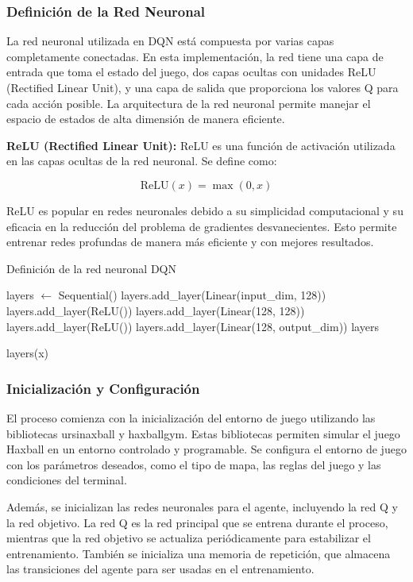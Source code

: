\documentclass[10pt]{article}
\begin{document}
\subsubsection{Definición de la Red Neuronal}
La red neuronal utilizada en DQN está compuesta por varias capas completamente conectadas. En esta implementación, la red tiene una capa de entrada que toma el estado del juego, dos capas ocultas con unidades ReLU (Rectified Linear Unit), y una capa de salida que proporciona los valores Q para cada acción posible. La arquitectura de la red neuronal permite manejar el espacio de estados de alta dimensión de manera eficiente.

\textbf{ReLU (Rectified Linear Unit):} ReLU es una función de activación utilizada en las capas ocultas de la red neuronal. Se define como:

\[ \text{ReLU}(x) = \max(0, x) \]

ReLU es popular en redes neuronales debido a su simplicidad computacional y su eficacia en la reducción del problema de gradientes desvanecientes. Esto permite entrenar redes profundas de manera más eficiente y con mejores resultados.

\begin{algorithm}
	\caption{Definición de la red neuronal DQN}
	\begin{algorithmic}[1]
		\State layers \(\leftarrow\) Sequential()
		\State layers.add\_layer(Linear(input\_dim, 128))
		\State layers.add\_layer(ReLU())
		\State layers.add\_layer(Linear(128, 128))
		\State layers.add\_layer(ReLU())
		\State layers.add\_layer(Linear(128, output\_dim))
		\State \Return layers
		\EndFunction

		\State \Return layers(x)
		\EndFunction
	\end{algorithmic}
\end{algorithm}


\subsubsection{Inicialización  y Configuración}
El proceso comienza con la inicialización del entorno de juego utilizando las bibliotecas ursinaxball y haxballgym. Estas bibliotecas permiten simular el juego Haxball en un entorno controlado y programable. Se configura el entorno de juego con los parámetros deseados, como el tipo de mapa, las reglas del juego y las condiciones del terminal.

Además, se inicializan las redes neuronales para el agente, incluyendo la red Q y la red objetivo. La red Q es la red principal que se entrena durante el proceso, mientras que la red objetivo se actualiza periódicamente para estabilizar el entrenamiento. También se inicializa una memoria de repetición, que almacena las transiciones del agente para ser usadas en el entrenamiento.
\end{document}
